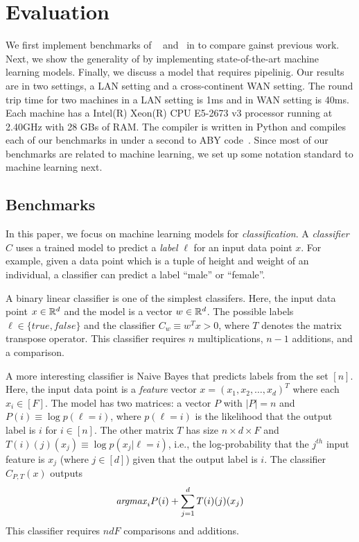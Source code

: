 \section{Evaluation}
\label{sec:eval}

We first implement benchmarks of ~\cite{shafindss} and~\cite{minionn} in \tool to compare gainst 
previous work.
Next, we show the generality of \tool by implementing state-of-the-art machine learning models.
Finally, we discuss a model that requires pipelinig.
Our results are in two settings, a LAN setting and a cross-continent WAN setting.
The round trip time for two machines in a LAN setting is 1ms and in WAN setting is 40ms.
Each machine has a Intel(R) Xeon(R) CPU E5-2673 v3 processor running at 2.40GHz with
28 GBs of RAM. The \tool compiler is written in Python and compiles each of our benchmarks
in under a second to ABY code~\cite{aby}. Since most of our benchmarks are related to machine learning, we set up some notation standard to machine learning next. 

\subsection{Benchmarks}
In this paper, we focus on machine learning models for {\it classification}.
A {\it classifier} $C$ uses a trained model to predict a {\it label} $\ell$ for an input data point $x$. For example, given a data point which is a tuple of height and weight of an individual,
a classifier can predict a label ``male'' or ``female''.

A binary linear classifier is one of the simplest classifers. Here, the input data point $x\in{\mathbb{R}}^d$
and the model is a vector $w\in{\mathbb{R}}^d$. The possible labels $\ell\in\{\mathit{true},\mathit{false}\}$
and the classifier $C_w\equiv w^Tx>0$, where $T$ denotes the matrix transpose operator.
This classifier requires $n$ multiplications, $n-1$ additions, and a comparison.

A more interesting classifier is Naive Bayes that predicts labels from the set $[n]$.
Here, the input data point is a {\it feature}
vector $x=(x_1,x_2,\ldots,x_d)^T$ where each $x_i\in [F]$.
The model has two matrices: a vector $P$ with $|P|=n$ and $P(i) \equiv \log p(\ell=i)$, where $p(\ell=i)$ is the likelihood that the output label is $i$ for $i\in[n]$.
The other matrix $T$ has size $n\times d\times F$ and $T(i)(j)(x_j)\equiv\log p(x_j|\ell=i)$, i.e., the log-probability that 
the $j^{th}$ input feature is $x_j$ (where $j\in [d]$) given that the output label is $i$.
The classifier $C_{P,T}(x)$ outputs
\[
{\it argmax}_i P(i)+\sum_{j=1}^d T(i)(j)(x_j)
\]
This classifier requires $ndF$ comparisons and additions.

